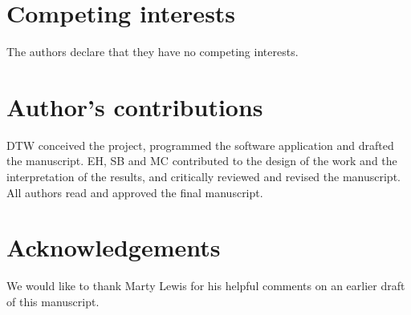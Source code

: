 \documentclass{bmcart}
\begin{document}

\begin{backmatter}

\section*{Competing interests}
  The authors declare that they have no competing interests.

\section*{Author's contributions}

DTW conceived the project, programmed the software application and drafted the manuscript. EH, SB and MC contributed to the design of the work and the interpretation of the results, and critically reviewed and revised the manuscript. All authors read and approved the final manuscript.

\section*{Acknowledgements}
  We would like to thank Marty Lewis for his helpful comments on an earlier draft of this manuscript.
  



\end{backmatter}
\end{document}

